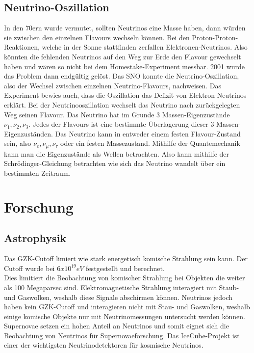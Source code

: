 \subsection{Neutrino-Oszillation}

In den 70ern wurde vermutet, sollten Neutrinos eine Masse haben, dann würden sie zwischen den einzelnen Flavours
wechseln können. \cite{Gribov1969}
Bei den Proton-Proton-Reaktionen, welche in der Sonne stattfinden zerfallen Elektronen-Neutrinos.
Also könnten die fehlenden Neutrinos auf den Weg zur Erde den Flavour gewechselt haben und wären so nicht bei dem
Homestake-Experiment messbar.
2001 wurde das Problem dann endgültig gelöst. Das SNO konnte die Neutrino-Oszillation, also der Wechsel
zwischen einzelnen Neutrino-Flavours, nachweisen. Das Experiment bewies auch,
dass die Oszillation das Defizit von Elektron-Neutrinos erklärt.\cite{Ahmad2001}
Bei der Neutrinooszillation wechselt das Neutrino nach zurückgelegten Weg seinen Flavour.
Das Neutrino hat im Grunde 3 Massen-Eigenzustände $\nu_1,\nu_2,\nu_3$. Jedes der Flavours ist eine bestimmte
Überlagerung dieser 3 Massen-Eigenzuständen. Das Neutrino kann in entweder einem festen Flavour-Zustand sein, also
$\nu_e,\nu_\mu,\nu_\tau$ oder ein festen Massezustand. Mithilfe der Quantemechanik kann man die Eigenzustände als
Wellen betrachten. Also kann mithilfe der Schrödinger-Gleichung betrachten wie sich das Neutrino wandelt über ein
bestimmten Zeitraum.

\section{Forschung}

\subsection{Astrophysik}

Das GZK-Cutoff limiert wie stark energetisch komische Strahlung sein kann.
Der Cutoff wurde bei $6x10^{19} eV$ festgestellt und berechnet. \\
Dies limitiert die Beobachtung von komischer Strahlung bei Objekten die weiter als 100 Megaparsec sind.
Elektromagnetische Strahlung interagiert mit Staub- und Gaswolken, weshalb diese Signale abschirmen können.
Neutrinos jedoch haben kein GZK-Cutoff und interagieren nicht mit Stau- und Gaswolken, weshalb einige
komische Objekte nur mit Neutrinomessungen untersucht werden können. Supernovae setzen ein hohen Anteil
an Neutrinos und somit eignet sich die Beobachtung von Neutrinos für Supernovaeforschung. Das IceCube-Projekt
ist einer der wichtigsten Neutrinodetektoren für kosmische Neutrinos.

